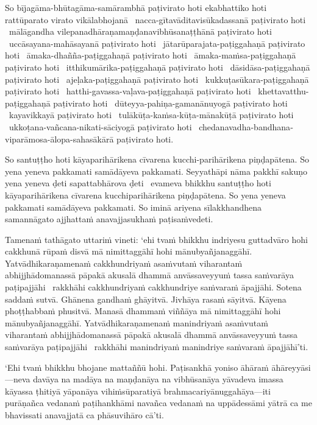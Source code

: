 So bījagāma-bhūtagāma-samārambhā paṭivirato hoti ekabhattiko hoti rattūparato virato vikālabhojanā \breathmark\ nacca-gītavāditavisūkadassanā paṭivirato hoti \breathmark\ mālā­gandha­ vilepana­dhāraṇa­maṇḍana­vibhūsanaṭṭhānā paṭivirato hoti \breathmark\ uccāsayana-mahāsayanā paṭivirato hoti \breathmark\ jātarūparajata-paṭiggahaṇā paṭivirato hoti \breathmark\ āmaka-dhañña-paṭiggahaṇā paṭivirato hoti \breathmark\ āmaka-maṁsa-paṭiggahaṇā paṭivirato hoti \breathmark\ itthikumārika-paṭiggahaṇā paṭivirato hoti \breathmark\ dāsidāsa-paṭiggahaṇā paṭivirato hoti \breathmark\ ajeḷaka-paṭiggahaṇā paṭivirato hoti \breathmark\ kukkuṭasūkara-paṭiggahaṇā paṭivirato hoti \breathmark\ hatthi-gavassa-vaḷava-paṭiggahaṇā paṭivirato hoti \breathmark\ khettavatthu-paṭiggahaṇā paṭivirato hoti \breathmark\ dūteyya-pahiṇa-gamanānuyogā paṭivirato hoti \breathmark\ kayavikkayā paṭivirato hoti \breathmark\ tulākūṭa-kaṁsa-kūṭa-mānakūṭā paṭivirato hoti \breathmark\ ukkoṭana-vañcana-nikati-sāciyogā paṭivirato hoti \breathmark\ chedana­vadha-bandhana­ viparāmosa-ālopa-sahasākārā paṭivirato hoti.

So santuṭṭho hoti kāyaparihārikena cīvarena kucchi-parihārikena piṇḍapātena. So yena yeneva pakkamati samādāyeva pakkamati. Seyyathāpi nāma pakkhī sakuṇo yena yeneva ḍeti sapattabhārova ḍeti \breathmark\ evameva bhikkhu santuṭṭho hoti kāyaparihārikena cīvarena kucchiparihārikena piṇḍapātena. So yena yeneva pakkamati samādāyeva pakkamati. So iminā ariyena sīlakkhandhena samannāgato ajjhattaṁ anavajjasukhaṁ paṭisaṁvedeti.

\suttaRef{[MN 51]}

Tamenaṁ tathāgato uttariṁ vineti: ‘ehi tvaṁ bhikkhu indriyesu guttadvāro hohi cakkhunā rūpaṁ disvā mā nimittaggāhī hohi mānubyañjanaggāhī. Yatvādhikaraṇamenaṁ cakkhundriyaṁ asaṁvutaṁ viharantaṁ abhijjhādomanassā pāpakā akusalā dhammā anvāssaveyyuṁ tassa saṁvarāya paṭipajjāhi \breathmark\ rakkhāhi cakkhundriyaṁ cakkhundriye saṁvaraṁ āpajjāhi. Sotena saddaṁ sutvā. Ghānena gandhaṁ ghāyitvā. Jivhāya rasaṁ sāyitvā. Kāyena phoṭṭhabbaṁ phusitvā. Manasā dhammaṁ viññāya mā nimittaggāhī hohi mānubyañjanaggāhī. Yatvādhikaraṇamenaṁ manindriyaṁ asaṁvutaṁ viharantaṁ abhijjhādomanassā pāpakā akusalā dhammā anvāssaveyyuṁ tassa saṁvarāya paṭipajjāhi \breathmark\ rakkhāhi manindriyaṁ manindriye saṁvaraṁ āpajjāhī’ti.

‘Ehi tvaṁ bhikkhu bhojane mattaññū hohi. Paṭisankhā yoniso āhāraṁ āhāreyyāsi—neva davāya na madāya na maṇḍanāya na vibhūsanāya yāvadeva imassa kāyassa ṭhitiyā yāpanāya vihiṁsūparatiyā brahmacariyānuggahāya—iti purāṇañca vedanaṁ paṭihankhāmi navañca vedanaṁ na uppādessāmi yātrā ca me bhavissati anavajjatā ca phāsuvihāro cā’ti.

